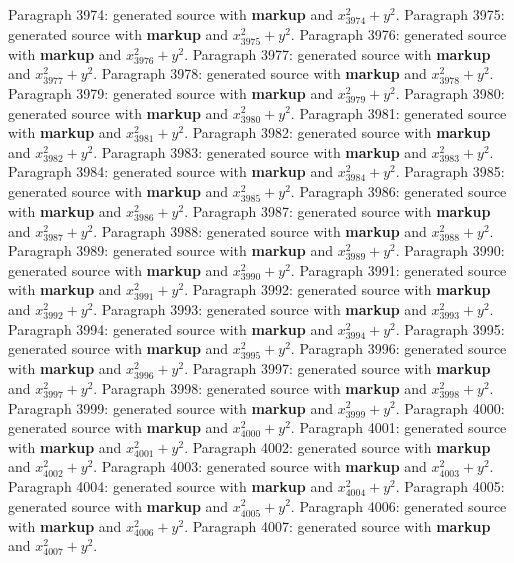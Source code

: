\documentclass{article}
\begin{document}
Paragraph 3974: generated source with \textbf{markup} and $x_{3974}^2 + y^2$.
Paragraph 3975: generated source with \textbf{markup} and $x_{3975}^2 + y^2$.
Paragraph 3976: generated source with \textbf{markup} and $x_{3976}^2 + y^2$.
Paragraph 3977: generated source with \textbf{markup} and $x_{3977}^2 + y^2$.
Paragraph 3978: generated source with \textbf{markup} and $x_{3978}^2 + y^2$.
Paragraph 3979: generated source with \textbf{markup} and $x_{3979}^2 + y^2$.
Paragraph 3980: generated source with \textbf{markup} and $x_{3980}^2 + y^2$.
Paragraph 3981: generated source with \textbf{markup} and $x_{3981}^2 + y^2$.
Paragraph 3982: generated source with \textbf{markup} and $x_{3982}^2 + y^2$.
Paragraph 3983: generated source with \textbf{markup} and $x_{3983}^2 + y^2$.
Paragraph 3984: generated source with \textbf{markup} and $x_{3984}^2 + y^2$.
Paragraph 3985: generated source with \textbf{markup} and $x_{3985}^2 + y^2$.
Paragraph 3986: generated source with \textbf{markup} and $x_{3986}^2 + y^2$.
Paragraph 3987: generated source with \textbf{markup} and $x_{3987}^2 + y^2$.
Paragraph 3988: generated source with \textbf{markup} and $x_{3988}^2 + y^2$.
Paragraph 3989: generated source with \textbf{markup} and $x_{3989}^2 + y^2$.
Paragraph 3990: generated source with \textbf{markup} and $x_{3990}^2 + y^2$.
Paragraph 3991: generated source with \textbf{markup} and $x_{3991}^2 + y^2$.
Paragraph 3992: generated source with \textbf{markup} and $x_{3992}^2 + y^2$.
Paragraph 3993: generated source with \textbf{markup} and $x_{3993}^2 + y^2$.
Paragraph 3994: generated source with \textbf{markup} and $x_{3994}^2 + y^2$.
Paragraph 3995: generated source with \textbf{markup} and $x_{3995}^2 + y^2$.
Paragraph 3996: generated source with \textbf{markup} and $x_{3996}^2 + y^2$.
Paragraph 3997: generated source with \textbf{markup} and $x_{3997}^2 + y^2$.
Paragraph 3998: generated source with \textbf{markup} and $x_{3998}^2 + y^2$.
Paragraph 3999: generated source with \textbf{markup} and $x_{3999}^2 + y^2$.
Paragraph 4000: generated source with \textbf{markup} and $x_{4000}^2 + y^2$.
Paragraph 4001: generated source with \textbf{markup} and $x_{4001}^2 + y^2$.
Paragraph 4002: generated source with \textbf{markup} and $x_{4002}^2 + y^2$.
Paragraph 4003: generated source with \textbf{markup} and $x_{4003}^2 + y^2$.
Paragraph 4004: generated source with \textbf{markup} and $x_{4004}^2 + y^2$.
Paragraph 4005: generated source with \textbf{markup} and $x_{4005}^2 + y^2$.
Paragraph 4006: generated source with \textbf{markup} and $x_{4006}^2 + y^2$.
Paragraph 4007: generated source with \textbf{markup} and $x_{4007}^2 + y^2$.
\end{document}
